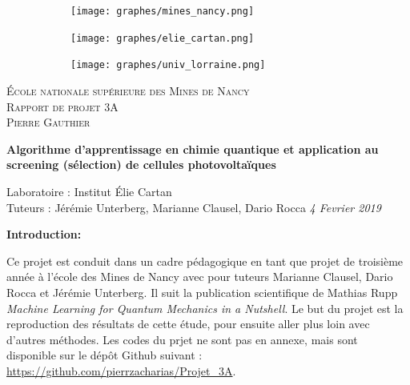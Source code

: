 \documentclass[a4paper,12pt,titlepage]{report}
\begin{document}
\begin{titlepage}
 
	\begin{center}
	\begin{figure}[!h]
	\centering	
		\begin{subfigure}[b]{0.3\textwidth}
		\texttt{[image: graphes/mines\_nancy.png]}
		\end{subfigure}
		\begin{subfigure}[b]{0.3\textwidth}
		\texttt{[image: graphes/elie\_cartan.png]}
		\end{subfigure}
		\begin{subfigure}[b]{0.3\textwidth}
		\texttt{[image: graphes/univ\_lorraine.png]}
	\end{subfigure}
	\end{figure}
 
	\textsc{École nationale supérieure des Mines de Nancy}\\[2cm]
	\textsc{Rapport de projet 3A}\\[1cm]
	\textsc{Pierre Gauthier}\\[1cm]
 
	\begin{doublespace}
		{ \huge \bfseries{Algorithme d'apprentissage en chimie quantique et application au screening (sélection) de cellules photovoltaïques}}\\[2cm]
	\end{doublespace}
	\textmd{Laboratoire : Institut Élie Cartan}\\[1cm]
	\textmd{Tuteurs : Jérémie Unterberg, Marianne Clausel, Dario Rocca}
	\vfill
	{\textit{{\large 4 Fevrier 2019}}}
 
	\end{center}
\end{titlepage}

\tableofcontents

\newpage



\textbf{\Huge Introduction:} \\
\newline

Ce projet est conduit dans un cadre pédagogique en tant que projet de troisième année à l'école des Mines de Nancy avec pour tuteurs Marianne Clausel, Dario Rocca et Jérémie Unterberg. Il suit la publication scientifique de Mathias Rupp \textit{Machine Learning for Quantum Mechanics in a Nutshell}.  
Le but du projet est la reproduction des résultats de cette étude, pour ensuite aller plus loin avec d'autres méthodes.
Les codes du prjet ne sont pas en annexe, mais sont disponible sur le dépôt Github suivant :  \url{https://github.com/pierrzacharias/Projet_3A}.
\end{document}
